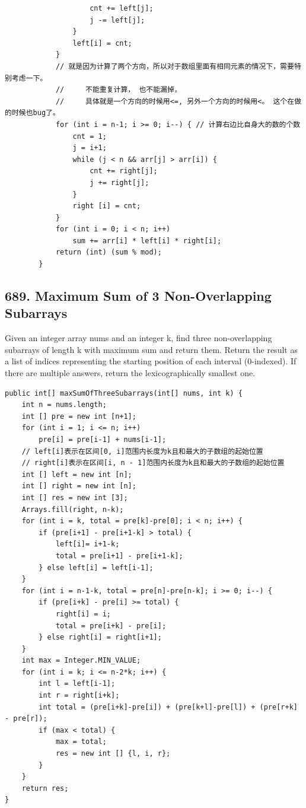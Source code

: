 \documentclass[9pt, b5paper]{article}
\begin{document}
\begin{verbatim}
                    cnt += left[j];
                    j -= left[j];
                }
                left[i] = cnt;
            }
            // 就是因为计算了两个方向，所以对于数组里面有相同元素的情况下，需要特别考虑一下。
            //     不能重复计算， 也不能漏掉，
            //     具体就是一个方向的时候用<=, 另外一个方向的时候用<。 这个在做的时候也bug了。
            for (int i = n-1; i >= 0; i--) { // 计算右边比自身大的数的个数
                cnt = 1;
                j = i+1;
                while (j < n && arr[j] > arr[i]) {
                    cnt += right[j];
                    j += right[j];
                }
                right [i] = cnt;
            }
            for (int i = 0; i < n; i++) 
                sum += arr[i] * left[i] * right[i];
            return (int) (sum % mod);
        }
\end{verbatim}

\subsection{689. Maximum Sum of 3 Non-Overlapping Subarrays}
\label{sec-4-39}
Given an integer array nums and an integer k, find three non-overlapping subarrays of length k with maximum sum and return them.
Return the result as a list of indices representing the starting position of each interval (0-indexed). If there are multiple answers, return the lexicographically smallest one.
\begin{verbatim}
public int[] maxSumOfThreeSubarrays(int[] nums, int k) {
    int n = nums.length;
    int [] pre = new int [n+1];
    for (int i = 1; i <= n; i++) 
        pre[i] = pre[i-1] + nums[i-1];
    // left[i]表示在区间[0, i]范围内长度为k且和最大的子数组的起始位置
    // right[i]表示在区间[i, n - 1]范围内长度为k且和最大的子数组的起始位置
    int [] left = new int [n];
    int [] right = new int [n];
    int [] res = new int [3];
    Arrays.fill(right, n-k);
    for (int i = k, total = pre[k]-pre[0]; i < n; i++) {
        if (pre[i+1] - pre[i+1-k] > total) {
            left[i]= i+1-k;
            total = pre[i+1] - pre[i+1-k];
        } else left[i] = left[i-1];
    }
    for (int i = n-1-k, total = pre[n]-pre[n-k]; i >= 0; i--) {
        if (pre[i+k] - pre[i] >= total) {
            right[i] = i;
            total = pre[i+k] - pre[i];
        } else right[i] = right[i+1];
    }
    int max = Integer.MIN_VALUE;
    for (int i = k; i <= n-2*k; i++) {
        int l = left[i-1];
        int r = right[i+k];
        int total = (pre[i+k]-pre[i]) + (pre[k+l]-pre[l]) + (pre[r+k] - pre[r]);
        if (max < total) {
            max = total;
            res = new int [] {l, i, r};
        }
    }
    return res;
}
\end{verbatim}
\end{document}
